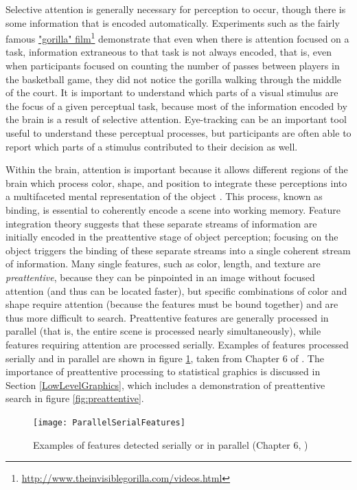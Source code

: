 \documentclass[11pt]{isuthesis}\usepackage[]{graphicx}\usepackage[]{color}
\begin{document}
Selective attention is generally necessary for perception to occur, though there is some information that is encoded automatically. Experiments such as the fairly famous \href{http://www.theinvisiblegorilla.com/videos.html}{"gorilla" film}\footnote{\url{http://www.theinvisiblegorilla.com/videos.html}} demonstrate that even when there is attention focused on a task, information extraneous to that task is not always encoded, that is, even when participants focused on counting the number of passes between players in the basketball game, they did not notice the gorilla walking through the middle of the court. It is important to understand which parts of a visual stimulus are the focus of a given perceptual task, because most of the information encoded by the brain is a result of selective attention. Eye-tracking can be an important tool useful to understand these perceptual processes, but participants are often able to report which parts of a stimulus contributed to their decision as well.

Within the brain, attention is important because it allows different regions of the brain which process color, shape, and position to integrate these perceptions into a multifaceted mental representation of the object \citep{goldstein}. This process, known as binding, is essential to coherently encode a scene into working memory. Feature integration theory \citep{treisman1980feature} suggests that these separate streams of information are initially encoded in the preattentive stage of object perception; focusing on the object triggers the binding of these separate streams into a single coherent stream of information. Many single features, such as color, length, and texture are \emph{preattentive}, because they can be pinpointed in an image without focused attention (and thus can be located faster), but specific combinations of color and shape require attention (because the features must be bound together) and are thus more difficult to search. Preattentive features are generally processed in parallel (that is, the entire scene is processed nearly simultaneously), while features requiring attention are processed serially. Examples of features processed  serially and in parallel are shown in figure \ref{fig:parallelSerialFeatures}, taken from Chapter 6 of \citet{helander1997handbook}. The importance of preattentive processing to statistical graphics is discussed in Section \ref{LowLevelGraphics}, which includes a demonstration of preattentive search in figure \ref{fig:preattentive}. 

\begin{figure}[htbp]\centering
\texttt{[image: ParallelSerialFeatures]}
\caption[Parallel and Serial Feature Detection]{Examples of features detected serially or in parallel (Chapter 6, \protect\citealt{helander1997handbook})}\label{fig:parallelSerialFeatures}
\end{figure}
\end{document}

